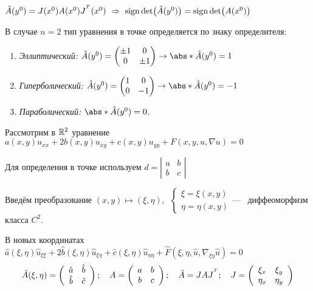 \documentclass[../main.tex]{subfiles}
\begin{document}
\begin{remark} $\hat{A}(y^0) = J(x^0)A(x^0)J^{{}^T}(x^0) \ \Rightarrow\ \operatorname{sign}\det\bigl( \hat{A}(y^0) \bigr) = \operatorname{sign}\det\bigl( A(x^0) \bigr)$ \end{remark}

В случае $n = 2$ тип уравнения в точке определяется по знаку определителя:
\begin{enumerate}
	\item \textit{Эллиптический: } $\hat{A}(y^0) = \begin{pmatrix}
		\pm1 & 0 \\ 0 & \pm1
		\end{pmatrix} \rightarrow \abs*{\hat{A}(y^0)} = 1$

	\item \textit{Гиперболический:} $\hat{A}(y^0) = \begin{pmatrix}
		1 & 0 \\ 0 & -1
		\end{pmatrix} \rightarrow \abs*{\hat{A}(y^0)} = -1$

	\item \textit{Параболический:}\; $\abs*{\hat{A}(y^0)} = 0$.
	
\end{enumerate}


Рассмотрим в $\mathbb{R}^2$ уравнение $a(x, y)u_{xx}+2b(x,y)u_{xy}+c(x,y)u_{yy} + F(x, y, u, \nabla u) = 0$

Для определения в точке используем $d =  \left| \begin{array}{cc}
a & b \\
b & c  \end{array} \right|$

Введём преобразование $ (x,y) \mapsto (\xi, \eta),\;\ \begin{cases} \xi = \xi(x, y) \\ \eta = \eta(x, y)\end{cases}$--- \ диффеоморфизм класса $C^2$.

В новых координатах \ $\hat{a}(\xi, \eta)\hat{u}_{\xi\xi} + 2\hat{b}(\xi, \eta)\hat{u}_{\xi\eta} + \hat{c}(\xi, \eta)\hat{u}_{\eta\eta} + \hat{F}(\xi,\eta,\hat{u},\nabla_{\xi\eta}\hat{u}) = 0$
%
$$\hat{A}(\xi, \eta) = \left( \begin{array}{cc}
\hat{a} & \hat{b} \\
\hat{b} & \hat{c}
\end{array}\right); \quad A = \left( \begin{array}{cc}
a & b \\
b & c
\end{array}\right); \quad \hat{A} = JAJ^{{}^T}; \quad J = \left(\begin{array}{cc}
\xi_x & \xi_y \\
\eta_x & \eta_y
\end{array}\right)$$
\end{document}
